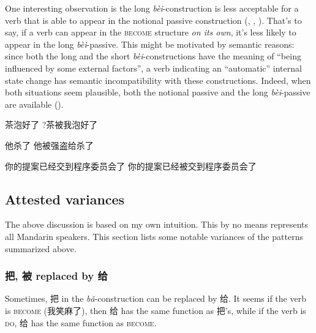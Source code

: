 \documentclass[UTF8, a4paper, oneside, scheme=plain]{ctexrep}
\newcommand*{\term}[1]{\emph{#1}}
\newcommand{\corpus}[1]{\emph{#1}}
\newcommand*{\category}[1]{\textsc{#1}}
\begin{document}
One interesting observation is the long \corpus{bèi}-construction
is less acceptable for 
a verb that is able to appear in the notional passive construction
(,
,
).
That's to say, 
if a verb can appear in the \category{become} structure \term{on its own},
it's less likely to appear in the long \corpus{bèi}-passive.
This might be motivated by semantic reasons:
since both the long and the short \corpus{bèi}-constructions 
have the meaning of ``being influenced by some external factors'',
a verb indicating an ``automatic'' internal state change 
has semantic incompatibility with these constructions. 
Indeed, when both situations seem plausible, 
both the notional passive and the long \corpus{bèi}-passive 
are available ().

\begin{exe}
    \ex\label{ex:verb-phrase.bei.notional-pass-conflict-1} \begin{xlist}
        \ex 茶泡好了
        \ex ?茶被我泡好了
    \end{xlist}
    \ex\label{ex:verb-phrase.bei.notional-pass-conflict-2} \begin{xlist}
        \ex *他杀了
        \ex 他被强盗给杀了
    \end{xlist}
    \ex\label{ex:verb-phrase.bei.notional-pass-conflict-3} \begin{xlist}
        \ex 你的提案已经交到程序委员会了
        \ex 你的提案已经被交到程序委员会了
    \end{xlist}
\end{exe}

\subsection{Attested variances}

The above discussion is based on my own intuition.
This by no means represents all Mandarin speakers. 
This section lists some notable variances of the patterns summarized above. 

\subsubsection{把, 被 replaced by 给}

Sometimes, 把 in the \corpus{bǎ}-construction can be replaced by 给.
It seems if the verb is \category{become} (我笑麻了),
then 给 has the same function as 把's, 
while if the verb is \category{do},
给 has the same function as \category{become}.
\end{document}
